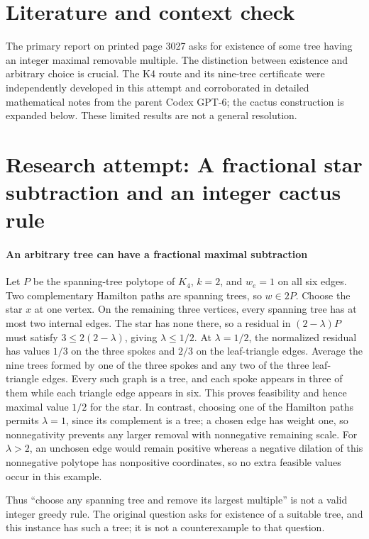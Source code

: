 \documentclass[11pt]{article}
\begin{document}
\section{Literature and context check}
The primary report on printed page 3027 asks for existence of some tree having an integer maximal removable multiple. The distinction between existence and arbitrary choice is crucial. The K4 route and its nine-tree certificate were independently developed in this attempt and corroborated in detailed mathematical notes from the parent Codex GPT-6; the cactus construction is expanded below. These limited results are not a general resolution.
\section{Research attempt: A fractional star subtraction and an integer cactus rule}

\paragraph{An arbitrary tree can have a fractional maximal subtraction}
Let $P$ be the spanning-tree polytope of $K_4$, $k=2$, and $w_e=1$ on all six edges. Two complementary Hamilton paths are spanning trees, so $w\in2P$. Choose the star $x$ at one vertex. On the remaining three vertices, every spanning tree has at most two internal edges. The star has none there, so a residual in $(2-\lambda)P$ must satisfy $3\leq2(2-\lambda)$, giving $\lambda\leq1/2$. At $\lambda=1/2$, the normalized residual has values $1/3$ on the three spokes and $2/3$ on the leaf-triangle edges. Average the nine trees formed by one of the three spokes and any two of the three leaf-triangle edges. Every such graph is a tree, and each spoke appears in three of them while each triangle edge appears in six. This proves feasibility and hence maximal value $1/2$ for the star. In contrast, choosing one of the Hamilton paths permits $\lambda=1$, since its complement is a tree; a chosen edge has weight one, so nonnegativity prevents any larger removal with nonnegative remaining scale. For $\lambda>2$, an unchosen edge would remain positive whereas a negative dilation of this nonnegative polytope has nonpositive coordinates, so no extra feasible values occur in this example.

Thus ``choose any spanning tree and remove its largest multiple'' is not a valid integer greedy rule. The original question asks for existence of a suitable tree, and this instance has such a tree; it is not a counterexample to that question.
\end{document}
